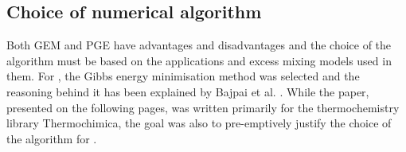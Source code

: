 \subsection{Choice of numerical algorithm}
	Both GEM and PGE have advantages and disadvantages and the choice of the algorithm must be based on the applications and excess mixing models used in them. For {\GEM}, the Gibbs energy minimisation method was selected and the reasoning behind it has been explained by Bajpai et al. \cite{Bajpai:2021ab}. While the paper, presented on the following pages, was written primarily for the thermochemistry library Thermochimica, the goal was also to pre-emptively justify the choice of the algorithm for {\GEM}. 
	
	 

